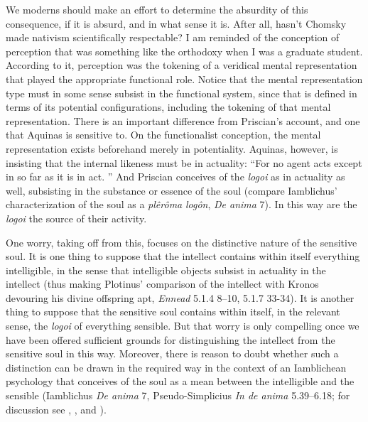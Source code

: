 \documentclass[12pt]{article}
\begin{document}
We moderns should make an effort to determine the absurdity of this consequence, if it is absurd, and in what sense it is. After all, hasn't Chomsky made nativism scientifically respectable? I am reminded of the conception of perception that was something like the orthodoxy when I was a graduate student. According to it, perception was the tokening of a veridical mental representation that played the appropriate functional role. Notice that the mental representation type must in some sense subsist in the functional system, since that is defined in terms of its potential configurations, including the tokening of that mental representation. There is an important difference from Priscian's account, and one that Aquinas is sensitive to. On the functionalist conception, the mental representation exists beforehand merely in potentiality. Aquinas, however, is insisting that the internal likeness must be in actuality: ``For no agent acts except in so far as it is in act. '' And Priscian conceives of the \emph{logoi} as in actuality as well, subsisting in the substance or essence of the soul (compare Iamblichus' characterization of the soul as a \emph{plêrôma} \emph{logôn}, \emph{De anima} 7). In this way are the \emph{logoi} the source of their activity.

One worry, taking off from this, focuses on the distinctive nature of the sensitive soul. It is one thing to suppose that the intellect contains within itself everything intelligible, in the sense that intelligible objects subsist in actuality in the intellect (thus making Plotinus' comparison of the intellect with Kronos devouring his divine offspring apt, \emph{Ennead} 5.1.4 8--10, 5.1.7 33-34). It is another thing to suppose that the sensitive soul contains within itself, in the relevant sense, the \emph{logoi} of everything sensible. But that worry is only compelling once we have been offered sufficient grounds for distinguishing the intellect from the sensitive soul in this way. Moreover, there is reason to doubt whether such a distinction can be drawn in the required way in the context of an Iamblichean psychology that conceives of the soul as a mean between the intelligible and the sensible (Iamblichus \emph{De anima} 7, Pseudo-Simplicius \emph{In de anima} 5.39--6.18; for discussion see \citealt{Steel:1978th}, \citealt[91--93]{Finamore:2002yf}, and \citealt{Finamore:2014fc}).
\end{document}
